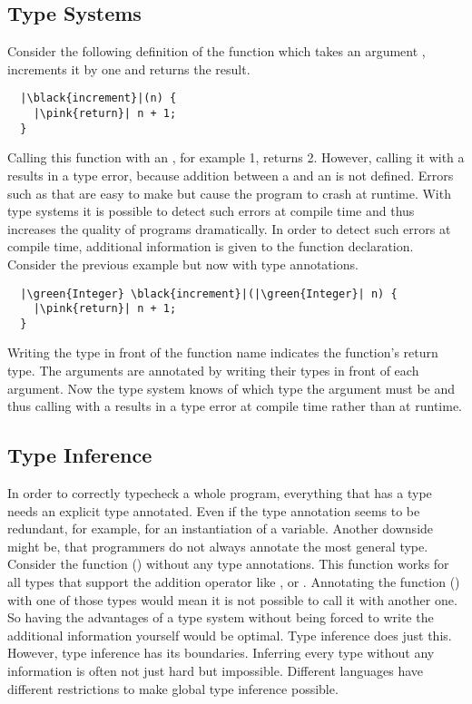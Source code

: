 \subsection{Type Systems}
Consider the following definition of the function  which takes an argument ,
increments it by one and returns the result.
\begin{verbatim}
  |\black{increment}|(n) {
    |\pink{return}| n + 1;
  }
\end{verbatim}
Calling this function with an , for example 1, returns 2.
However, calling it with a  results in a type error, because addition between a 
and an  is not defined.
Errors such as that are easy to make but cause the program to crash at runtime.
With type systems it is possible to detect such errors at compile time and thus increases the quality of programs dramatically.
In order to detect such errors at compile time, additional information is given to the function declaration.
Consider the previous example but now with type annotations.
\begin{verbatim}
  |\green{Integer} \black{increment}|(|\green{Integer}| n) {
    |\pink{return}| n + 1;
  }
\end{verbatim}
Writing the type  in front of the function name indicates the function's return type.
The arguments are annotated by writing their types in front of each argument.
Now the type system knows of which type the argument must be and thus calling  with a  results in a type error at compile time rather than at runtime.

\subsection{Type Inference}
In order to correctly typecheck a whole program, everything that has a type needs an explicit type annotated.
Even if the type annotation seems to be redundant, for example, for an instantiation of a variable.
Another downside might be, that programmers do not always annotate the most general type. Consider the function  (\inl{+}) without any type annotations. This function works for all types that support the addition operator like ,  or .
Annotating the function () with one of those types would mean it is not possible to call it with another one.\\
So having the advantages of a type system without being forced to write the additional information yourself would be optimal. Type inference does just this.
However, type inference has its boundaries. Inferring every type without any information is often not just hard but impossible. Different languages have different restrictions to make global type inference possible.

